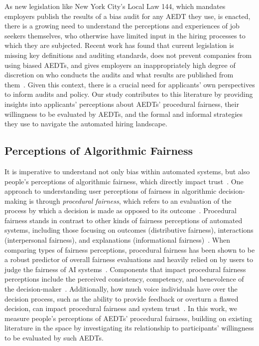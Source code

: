 As new legislation like New York City's Local Law 144, which mandates employers publish the results of a bias audit for any AEDT they use, is enacted, there is a growing need to understand the perceptions and experiences of job seekers themselves, who otherwise have limited input in the hiring processes to which they are subjected. Recent work has found that current legislation is missing key definitions and auditing standards, does not prevent companies from using biased AEDTs, and gives employers an inappropriately high degree of discretion on who conducts the audits and what results are published from them~\cite{groves2024auditing, wright2024null}. Given this context, there is a crucial need for applicants' own perspectives to inform audits and policy. Our study contributes to this literature by providing insights into applicants' perceptions about AEDTs' procedural fairness, their willingness to be evaluated by AEDTs, and the formal and informal strategies they use to navigate the automated hiring landscape.


\subsection{Perceptions of Algorithmic Fairness}

It is imperative to understand not only bias within automated systems, but also people's perceptions of algorithmic fairness, which directly impact trust~\cite{woodruff2018qualitative, lee2018understanding}. One approach to understanding user perceptions of fairness in algorithmic decision-making is through \textit{procedural fairness}, which refers to an evaluation of the process by which a decision is made as opposed to its outcome~\cite{lee2019procedural, schoeffer2021appropriate}. Procedural fairness stands in contrast to other kinds of fairness perceptions of automated systems, including those focusing on outcomes (distributive fairness), interactions (interpersonal fairness), and  explanations (informational fairness)~\cite{colquitt2012organizational, schoeffer2021appropriate}. When comparing types of fairness perceptions, procedural fairness has been shown to be a robust predictor of overall fairness evaluations and heavily relied on by users to judge the fairness of AI systems~\cite{thibaut1975procedural, morse2021ends, glikson2020human}. Components that impact procedural fairness perceptions include the perceived consistency, competency, and benevolence of the decision-maker~\cite{lee2019procedural, morse2021ends, leventhal1980should, tyler2003procedural}. Additionally, how much voice individuals have over the decision process, such as the ability to provide feedback or overturn a flawed decision, can impact procedural fairness and system trust~\cite{lee2019procedural, morse2021ends, lind1990voice, folger1977distributive, jeung2023correct}. In this work, we measure people's perceptions of AEDTs' procedural fairness, building on existing literature in the space by investigating its relationship to participants' willingness to be evaluated by such AEDTs.

